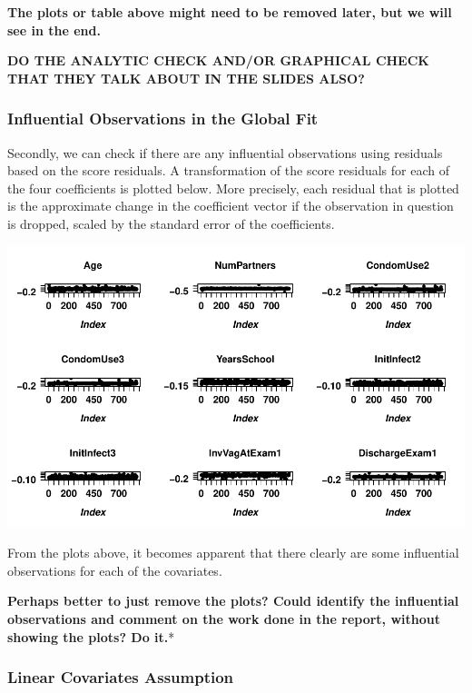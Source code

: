 \documentclass[
]{article}
\begin{document}
\textbf{The plots or table above might need to be removed later, but we will see in the end.}

\textbf{DO THE ANALYTIC CHECK AND/OR GRAPHICAL CHECK THAT THEY TALK ABOUT IN THE SLIDES ALSO?}

\hypertarget{influential-observations-in-the-global-fit}{%
\subsubsection{Influential Observations in the Global Fit}\label{influential-observations-in-the-global-fit}}

Secondly, we can check if there are any influential observations using residuals based on the score residuals. A transformation of the score residuals for each of the four coefficients is plotted below. More precisely, each residual that is plotted is the approximate change in the coefficient vector if the observation in question is dropped, scaled by the standard error of the coefficients.

\includegraphics{practical_files/figure-latex/unnamed-chunk-7-1.pdf}

From the plots above, it becomes apparent that there clearly are some influential observations for each of the covariates.

\textbf{Perhaps better to just remove the plots? Could identify the influential observations and comment on the work done in the report, without showing the plots? Do it.}*

\hypertarget{linear-covariates-assumption}{%
\subsubsection{Linear Covariates Assumption}\label{linear-covariates-assumption}}
\end{document}
